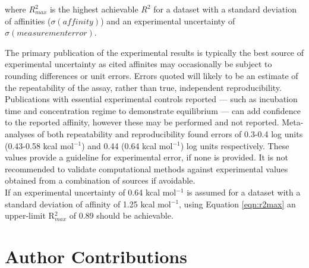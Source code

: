 \documentclass[9pt,bestpractices]{livecoms}
\begin{document}
where $R^2_{max}$ is the highest achievable $R^2$ for a dataset with a standard deviation of affinities ($\sigma(affinity)$) and an experimental uncertainty of  $\sigma(measurement  error)$\cite{sheridan2020experimental}.

The primary publication of the experimental results is typically the best source of experimental uncertainty as cited affinites may occasionally be subject to rounding differences or unit errors\cite{kramer2012experimental}. Errors quoted will likely to be an estimate of the repeatability of the assay, rather than true, independent reproducibility. Publications with essential experimental controls reported --- such as incubation time and concentration regime to demonstrate equilibrium --- can add confidence to the reported affinity, however these may be performed and not reported\cite{jarmoskaite2020measure}. Meta-analyses of both repeatability\cite{sheridan2020experimental} and reproducibility\cite{kramer2012experimental} found errors of 0.3-0.4 log units (0.43-0.58 kcal mol$^{-1}$) and 0.44 (0.64 kcal mol$^{-1}$) log units respectively. These values provide a guideline for experimental error, if none is provided. It is not recommended to validate computational methods against experimental values obtained from a combination of sources if avoidable.\\

If an experimental uncertainty of 0.64 kcal mol$^{-1}$ is assumed for a dataset with a standard deviation of affinity of 1.25 kcal mol$^{-1}$, using Equation \ref{eqn:r2max} an upper-limit R$^2_{max}$ of 0.89 should be achievable.


\section{Author Contributions}
%
\end{document}
